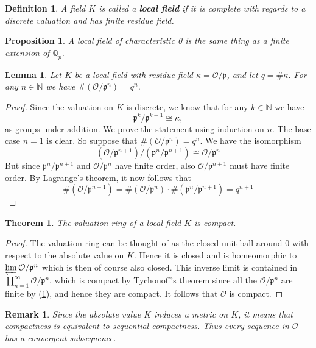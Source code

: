 \documentclass{article}
\newtheorem{theorem}{Theorem}[section]
\newtheorem{definition}{Definition}[section]
\newtheorem{proposition}{Proposition}[section]
\newtheorem{lemma}{Lemma}[section]
\newtheorem{remark}{Remark}[section]
\newcommand{\mfrak}[1]{\mathfrak{#1}}
\newcommand{\mcal}[1]{\mathcal{#1}}
\newcommand{\mbb}[1]{\mathbb{#1}}
\begin{document}
\begin{definition}
    A field $K$ is called a \textbf{local field} if it is complete with regards to a discrete valuation and has finite residue field.
\end{definition}

\begin{proposition}
    A local field of characteristic 0 is the same thing as a finite extension of $\mbb Q_p$.
\end{proposition}

\begin{lemma}\label{lem: Valuation ring mod power of prime is finite in local field}
    Let $K$ be a local field with residue field $\kappa = \mcal O / \mfrak p$, and let $q = \# \kappa$. For any $n \in \mbb N$ we have $\# (\mcal O / \mfrak p^n) = q^n$.
\end{lemma}

\begin{proof}
    Since the valuation on $K$ is discrete, we know that for any $k \in \mbb N$ we have $$\mfrak p^k / \mfrak p^{k+1} \cong \kappa,$$
    as groups under addition. We prove the statement using induction on $n$. The base case $n = 1$ is clear. So suppose that $\# (\mcal O / \mfrak p^n) = q^n$. We have the isomorphism
    $$(\mcal O / \mfrak p^{n+1}) / (\mfrak p^n / \mfrak p^{n+1}) \cong \mcal O / \mfrak p^{n}$$
    But since $\mfrak p^n / \mfrak p^{n+1}$ and $\mcal O / \mfrak p^{n}$ have finite order, also $\mcal O / \mfrak p^{n+1}$ must have finite order. By Lagrange's theorem, it now follows that $$\# (\mcal O / \mfrak p^{n+1}) = \# (\mcal O / \mfrak p^{n}) \cdot \# (\mfrak p^n / \mfrak p^{n+1}) = q^{n+1}$$
\end{proof}

\begin{theorem} \label{thm: Valuation ring in local field is compact}
    The valuation ring of a local field $K$ is compact.
\end{theorem}
\begin{proof}
    The valuation ring can be thought of as the closed unit ball around 0 with respect to the absolute value on $K$. Hence it is closed and is homeomorphic to $\varprojlim \mcal O / \mfrak p^n$ which is then of course also closed. This inverse limit is contained in $\prod_{n = 1}^\infty \mcal O / \mfrak p^n$, which is compact by Tychonoff's theorem since all the $\mcal O / \mfrak p^n$ are finite by (\ref{lem: Valuation ring mod power of prime is finite in local field}), and hence they are compact. It follows that $\mcal O$ is compact.
\end{proof}
\begin{remark}\label{rem: Compactness is equivalent to sequential compactness}
    Since the absolute value $K$ induces a metric on $K$, it means that compactness is equivalent to sequential compactness. Thus every sequence in $\mcal O$ has a convergent subsequence.
\end{remark}
\end{document}
